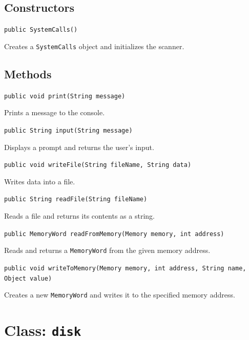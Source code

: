\documentclass[12pt,a4paper]{article}
\begin{document}
\subsection{Constructors}

\begin{signaturebox}
\texttt{public SystemCalls()}
\end{signaturebox}

Creates a \texttt{SystemCalls} object and initializes the scanner.

\subsection{Methods}

\begin{signaturebox}
\texttt{public void print(String message)}
\end{signaturebox}
Prints a message to the console.

\begin{signaturebox}
\texttt{public String input(String message)}
\end{signaturebox}
Displays a prompt and returns the user's input.

\begin{signaturebox}
\texttt{public void writeFile(String fileName, String data)}
\end{signaturebox}
Writes data into a file.

\begin{signaturebox}
\texttt{public String readFile(String fileName)}
\end{signaturebox}
Reads a file and returns its contents as a string.

\begin{signaturebox}
\texttt{public MemoryWord readFromMemory(Memory memory, int address)}
\end{signaturebox}
Reads and returns a \texttt{MemoryWord} from the given memory address.

\begin{signaturebox}
\texttt{public void writeToMemory(Memory memory, int address, String name, Object value)}
\end{signaturebox}
Creates a new \texttt{MemoryWord} and writes it to the specified memory address.

\section{Class: \texttt{disk}}
\end{document}

